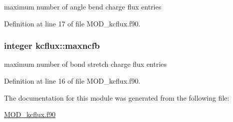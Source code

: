 maximum number of angle bend charge flux entries 



Definition at line 17 of file M\-O\-D\-\_\-kcflux.\-f90.

\hypertarget{classkcflux_a46f26e9cd59b945af602a5b971d2ec86}{
\subsubsection[{maxncfb}]{\setlength{\rightskip}{0pt plus 5cm}integer kcflux\-::maxncfb}}\label{classkcflux_a46f26e9cd59b945af602a5b971d2ec86}


maximum number of bond stretch charge flux entries 



Definition at line 16 of file M\-O\-D\-\_\-kcflux.\-f90.



The documentation for this module was generated from the following file\-:\begin{DoxyCompactItemize}
\item 
\hyperlink{MOD__kcflux_8f90}{M\-O\-D\-\_\-kcflux.\-f90}\end{DoxyCompactItemize}
